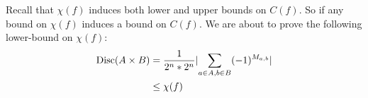 Recall that $\chi(f)$ induces both lower and upper bounds on $C(f)$.
So if any bound on $\chi(f)$ induces a bound on $C(f)$.
We are about to prove the following lower-bound on $\chi(f)$:
\[\begin{aligned}\text{Disc}(A \times B) 
	& = \frac{1}{2^n * 2^n}\lvert\sum_{a \in A, b \in B} (-1)^{M_{a,b}}\rvert \\
	& \leq \chi(f)
\end{aligned}\]